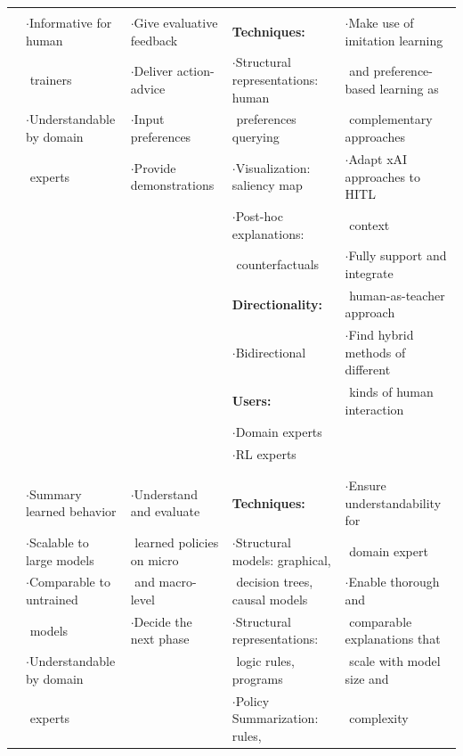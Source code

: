 \documentclass[twoside,11pt]{article}
\begin{document}
\begin{table}[!htbp]
{\begin{tabular}{|c||l|l|l|l|}
			&  &  & & \\
			& $\cdot$Informative for human  &	 $\cdot$Give evaluative feedback	&	 \textbf{Techniques:} 	&	$\cdot$Make use of imitation learning	\\
			& $ $ trainers&	$\cdot$Deliver action-advice	&	 $\cdot$Structural representations: human	&	$ $ and preference-based learning as 	\\
			& $\cdot$Understandable by domain &	 $\cdot$Input preferences 	&	 $ $ preferences querying 	&	$ $ complementary approaches	\\
			& $ $ experts&	 $\cdot$Provide demonstrations 	&	$\cdot$Visualization: saliency map  	&	$\cdot$Adapt xAI approaches to HITL\\
			&&&$\cdot$Post-hoc explanations: & $ $ context\\
			&&&$ $ counterfactuals & $\cdot$Fully support and integrate \\
			&&&\textbf{Directionality:} & $ $ human-as-teacher approach \\
			&  & 	&	 $\cdot$Bidirectional 	&$\cdot$Find hybrid methods of different\\
			&   & 	&	 \textbf{Users:}	&	$ $ kinds of human interaction	\\
			&   & 	&	 $\cdot$Domain experts	&	$ $	\\
			&   & 	&	 $\cdot$RL experts	&	\\
			&  &  & & \\
			\cline{1-5}
			\multirow{14}{*}{\rotatebox{90}{\hspace{0em}\textsc{Evaluation}}}
			&  &  & & \\
			& $\cdot$Summary learned behavior  & $\cdot$Understand and evaluate	&	 \textbf{Techniques:}	& $\cdot$Ensure understandability for 	\\
			&  $\cdot$Scalable to large models & $ $ learned policies on micro	&	 $\cdot$Structural models: graphical, 	&$ $ domain expert	\\
			& $\cdot$Comparable to untrained   & $ $ and macro-level	&	 $ $ decision trees, causal models	&	$\cdot$Enable thorough and \\
			& $ $ models   & $\cdot$Decide the next phase	&	 $\cdot$Structural representations:&	$ $ comparable explanations that  \\
			& $\cdot$Understandable by domain & & $ $ logic rules, programs& $ $ scale with model size and \\
			& $ $ experts & & $\cdot$Policy Summarization: rules, & $ $ complexity \\

\end{tabular}}
\end{table}
\end{document}
